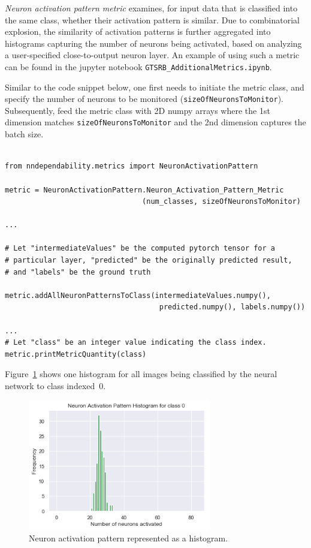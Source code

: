 \documentclass{article}
\begin{document}
\emph{Neuron activation pattern metric} examines, for input data that is classified into the same class, whether their activation pattern is similar. Due to combinatorial explosion, the similarity of activation patterns is further aggregated into histograms capturing the number of neurons being activated, based on analyzing a user-specified close-to-output neuron layer. An example of using such a metric can be found in the jupyter notebook \texttt{GTSRB\_AdditionalMetrics.ipynb}.

Similar to the code snippet below, one first needs to initiate the metric class, and specify the number of neurons to be monitored (\texttt{sizeOfNeuronsToMonitor}). Subsequently, feed the metric class with 2D numpy arrays where the 1st dimension matches \texttt{sizeOfNeuronsToMonitor} and the 2nd dimension captures the batch size.  

\begin{small}
\color{blue}
\begin{verbatim}

from nndependability.metrics import NeuronActivationPattern

metric = NeuronActivationPattern.Neuron_Activation_Pattern_Metric
                                (num_classes, sizeOfNeuronsToMonitor)

...

# Let "intermediateValues" be the computed pytorch tensor for a 
# particular layer, "predicted" be the originally predicted result,
# and "labels" be the ground truth

metric.addAllNeuronPatternsToClass(intermediateValues.numpy(),
                                    predicted.numpy(), labels.numpy())

...
# Let "class" be an integer value indicating the class index.
metric.printMetricQuantity(class)

\end{verbatim}
\end{small}

Figure~\ref{fig.histogram} shows one histogram for all images being classified by the neural network to class indexed~$0$. 

\begin{figure}[ht]
\centering
\includegraphics[width=8cm]{fig/ActivationPattern.png}
\caption{Neuron activation pattern represented as a histogram.}
\label{fig.histogram}
\end{figure}
\end{document}
